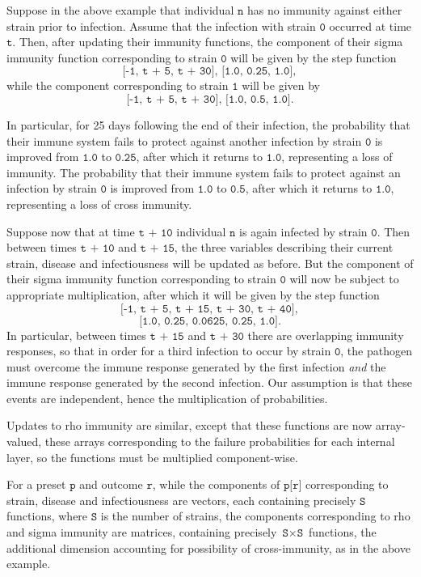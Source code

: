 \documentclass[10pt,letterpaper]{article}
\begin{document}
Suppose in the above example that individual $\texttt{n}$ has no immunity against either strain prior to infection. Assume that the infection with strain $\texttt{0}$ occurred at time $\texttt{t}$. Then, after updating their immunity functions, the component of their sigma immunity function corresponding to strain $\texttt{0}$ will be given by the step function $$\texttt{[-1, t + 5, t + 30], [1.0, 0.25, 1.0]},$$ while the component corresponding to strain $\texttt{1}$ will be given by $$\texttt{[-1, t + 5, t + 30], [1.0, 0.5, 1.0]}.$$

In particular, for 25 days following the end of their infection, the probability that their immune system fails to protect against another infection by strain $\texttt{0}$ is improved from $\texttt{1.0}$ to $\texttt{0.25}$, after which it returns to $\texttt{1.0}$, representing a loss of immunity. The probability that their immune system fails to protect against an infection by strain $\texttt{0}$ is improved from $\texttt{1.0}$ to $\texttt{0.5}$, after which it returns to $\texttt{1.0}$, representing a loss of cross immunity.

Suppose now that at time $\texttt{t + 10}$ individual $\texttt{n}$ is again infected by strain $\texttt{0}$. Then between times $\texttt{t + 10}$ and $\texttt{t + 15}$, the three variables describing their current strain, disease and infectiousness will be updated as before. But the component of their sigma immunity function corresponding to strain $\texttt{0}$ will now be subject to appropriate multiplication, after which it will be given by the step function $$\texttt{[-1, t + 5, t + 15, t + 30, t + 40]},$$ $$\texttt{[1.0, 0.25, 0.0625, 0.25, 1.0]}.$$ In particular, between times $\texttt{t + 15}$ and $\texttt{t + 30}$ there are overlapping immunity responses, so that in order for a third infection to occur by strain $\texttt{0}$, the pathogen must overcome the immune response generated by the first infection \textit{and} the immune response generated by the second infection. Our assumption is that these events are independent, hence the multiplication of probabilities.

Updates to rho immunity are similar, except that these functions are now array-valued, these arrays corresponding to the failure probabilities for each internal layer, so the functions must be multiplied component-wise.

For a preset $\texttt{p}$ and outcome $\texttt{r}$, while the components of $\texttt{p[r]}$ corresponding to strain, disease and infectiousness are vectors, each containing precisely $\texttt{S}$ functions, where $\texttt{S}$ is the number of strains, the components corresponding to rho and sigma immunity are matrices, containing precisely $\texttt{S} \times \texttt{S}$ functions, the additional dimension accounting for possibility of cross-immunity, as in the above example.
\end{document}
